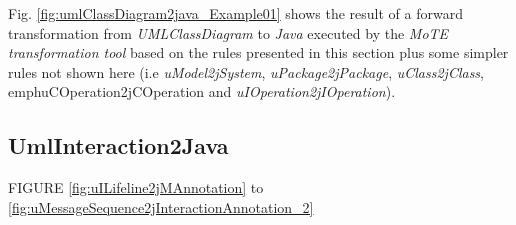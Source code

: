 \documentclass[tuberlin,cic,tc,english,noabntcite]{iiufrgs}
\begin{document}
Fig. \ref{fig:umlClassDiagram2java_Example01} shows the result of a forward transformation from \emph{UMLClassDiagram} to \emph{Java} executed by the \emph{MoTE transformation tool} based on the rules presented in this section plus some simpler rules not shown here (i.e \emph{uModel2jSystem}, \emph{uPackage2jPackage}, \emph{uClass2jClass}, emph{uCOperation2jCOperation} and \emph{uIOperation2jIOperation}).

\subsection{UmlInteraction2Java}
\label{subsec:UmlSequenceDiagram2Java}
FIGURE \ref{fig:uILifeline2jMAnnotation} to \ref{fig:uMessageSequence2jInteractionAnnotation_2}
\end{document}
